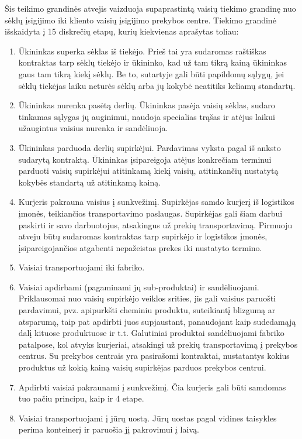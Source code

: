 Šis teikimo grandinės atvejis vaizduoja supaprastintą vaisių tiekimo grandinę nuo sėklų įsigijimo iki kliento vaisių įsigijimo prekybos centre. Tiekimo grandinė išskaidyta į 15 diskrečių etapų, kurių kiekvienas aprašytas toliau:
\begin{enumerate}
    \item Ūkininkas superka sėklas iš tiekėjo. Prieš tai yra sudaromas raštiškas kontraktas tarp sėklų tiekėjo ir ūkininko, kad už tam tikrą kainą ūkininkas gaus tam tikrą kiekį sėklų. Be to, sutartyje gali būti papildomų sąlygų, jei sėklų tiekėjas laiku neturės sėklų arba jų kokybė neatitiks keliamų standartų.
    \item Ūkininkas nurenka pasėtą derlių. Ūkininkas pasėja vaisių sėklas, sudaro tinkamas sąlygas jų auginimui, naudoja specialias trąšas ir atėjus laikui užaugintus vaisius nurenka ir sandėliuoja.
    \item Ūkininkas parduoda derlių supirkėjui. Pardavimas vyksta pagal iš anksto sudarytą kontraktą. Ūkininkas įsipareigoja atėjus konkrečiam terminui parduoti vaisių supirkėjui atitinkamą kiekį vaisių, atitinkančių nustatytą kokybės standartą už atitinkamą kainą.
    \item Kurjeris pakrauna vaisius į sunkvežimį. Supirkėjas samdo kurjerį iš logistikos įmonės, teikiančios transportavimo paslaugas. Supirkėjas gali šiam darbui paskirti ir savo darbuotojus, atsakingus už prekių transportavimą. Pirmuoju atveju būtų sudaromas kontraktas tarp supirkėjo ir logistikos įmonės, įsipareigojančios atgabenti nepažeistas prekes iki nustatyto termino.
    \item Vaisiai transportuojami iki fabriko.
    \item Vaisiai apdirbami (pagaminami jų sub-produktai) ir sandėliuojami. Priklausomai nuo vaisių supirkėjo veiklos srities, jis gali vaisius paruošti pardavimui, pvz. apipurkšti cheminiu produktu, suteikiantį blizgumą ar atsparumą, taip pat apdirbti juos supjaustant, panaudojant kaip sudedamąją dalį kituose produktuose ir t.t. Galutiniai produktai sandėliuojami fabriko patalpose, kol atvyks kurjeriai, atsakingi už prekių transportavimą į prekybos centrus. Su prekybos centrais yra pasirašomi kontraktai, nustatantys kokius produktus už kokią kainą vaisių supirkėjas parduos prekybos centrui.
    \item Apdirbti vaisiai pakraunami į sunkvežimį. Čia kurjeris gali būti samdomas tuo pačiu principu, kaip ir 4 etape.
    \item Vaisiai transportuojami į jūrų uostą. Jūrų uostas pagal vidines taisykles perima konteinerį ir paruošia jį pakrovimui į laivą.

\end{enumerate}
